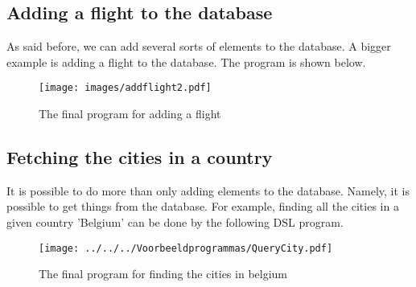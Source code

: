 \subsection{Adding a flight to the database}
As said before, we can add several sorts of elements to the database. A bigger example is adding a flight to the database. The program is shown below.
\begin{figure}[H]
	\centering
	\texttt{[image: images/addflight2.pdf]}
	\caption{The final program for adding a flight}
	\label{ex:addFlight}
\end{figure}

\subsection{Fetching the cities in a country}
It is possible to do more than only adding elements to the database. Namely, it is possible to get things from the database. For example, finding all the cities in a given country 'Belgium' can be done by the following DSL program.
\begin{figure}[H]
	\centering
	\texttt{[image: ../../../Voorbeeldprogrammas/QueryCity.pdf]}
	\caption{The final program for finding the cities in belgium}
	\label{ex:getCities}
\end{figure}